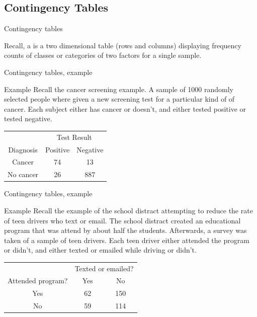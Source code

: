 \documentclass[xcolor=table, handout]{beamer}
\begin{document}
\subsection{Contingency Tables}

\begin{frame}{Contingency tables}
\begin{block}{}
\large
Recall, a  is a two dimensional table (rows and columns) displaying frequency counts of classes or categories of two factors for a single sample.
\end{block}
\end{frame}

\begin{frame}{Contingency tables, example}
\begin{exampleblock}{Example}
Recall the cancer screening example. A sample of 1000 randomly selected people where given a new screening test for a particular kind of of cancer. Each subject either has cancer or doesn't, and either tested positive or tested negative.\\
\medskip
{\centering
\begin{tabular}{c | c  c}
\multicolumn{1}{c}{} & \multicolumn{2}{c}{Test Result}\\
Diagnosis & Positive & Negative\\
\hline
Cancer & 74 & 13\\
No cancer & 26 & 887 \\
\end{tabular}
\par}
\smallskip

\end{exampleblock}
\end{frame}

\begin{frame}{Contingency tables, example}
\begin{exampleblock}{Example}
Recall the example of the school distract attempting to reduce the rate of teen drivers who text or email. The school distract created an educational program that was attend by about half the students. Afterwards, a survey was taken of a sample of teen drivers. Each teen driver either attended the program or didn't, and either texted or emailed while driving or didn't.\\
\medskip
{\centering
\begin{tabular}{c | c  c}
\multicolumn{1}{c}{} & \multicolumn{2}{c}{Texted or emailed?}\\
Attended program? & Yes & No\\
\hline
Yes & 62 & 150\\
No & 59 & 114 \\
\end{tabular}
\par}
\smallskip

\end{exampleblock}
\end{frame}
\end{document}
